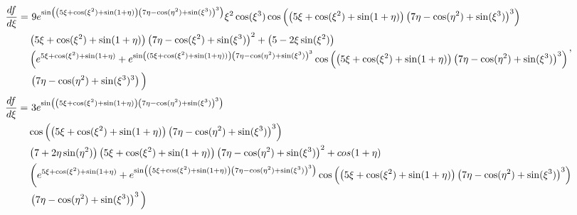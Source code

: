 \begin{landscape}   
    \begin{equation}
        \begin{split}
            \frac{df}{d\xi} =& ~9 e^{\sin\left(\left(5\xi + \cos(\xi^2) + \sin(1 +\eta)\right) \left(7\eta - \cos(\eta^2) + \sin(\xi^3) \right)^3\right)} \xi^2 \cos(\xi^3) \cos\left(\left(5\xi + \cos(\xi^2) + \sin(1+\eta) \right) \left(7\eta - \cos(\eta^2) + \sin(\xi^3) \right)^3\right)\\
            &\left(5\xi + \cos(\xi^2) + \sin(1 + \eta)\right)\left(7\eta - \cos(\xi^2) + \sin(\xi^3)\right)^2 + \left(5 - 2\xi\sin(\xi^2)\right)\\
            &\left(e^{5\xi + \cos(\xi^2) + \sin(1 + \eta)} + e^{\sin\left((5\xi + \cos(\xi^2) + \sin(1 + \eta))\right) \left(7\eta -\cos(\eta^2) +\sin(\xi^3) \right)^3}\cos\left(\left(5\xi +\cos(\xi^2) + \sin(1 + \eta)\right) \left(7\eta - \cos(\eta^2) + \sin(\xi^3) \right)^3 \right)\right.\\
            &\left. \left(7 \eta - \cos(\eta^2) + \sin(\xi^3)^3\right) \vphantom{e^{{5\xi + \cos(\xi^2) + \sin(1 + \eta)}}}\right)
        \end{split},
    \end{equation}
    \begin{equation}
        \begin{split}
            \frac{df}{d\xi} =& ~3e^{\sin\left(\left(5\xi + \cos(\xi^2) + \sin(1 + \eta) \right)\left(7 \eta - \cos(\eta^2) +\sin(\xi^3) \right)^3 \right)} \\
            & \cos\left(\left(5\xi + \cos(\xi^2) + \sin(1 + \eta) \right)\left(7\eta -\cos(\eta^2)+\sin(\xi^3)\right)^3 \right) \\
            & \left(7 + 2\eta \sin(\eta^2)\right)\left(5\xi +\cos(\xi^2) +\sin(1 +\eta)\right)\left(7\eta -\cos(\eta^2) + \sin(\xi^3) \right)^2 + cos(1 + \eta)\\
            & \left(e^{5\xi + \cos(\xi^2) + \sin(1 + \eta)} + e^{\sin\left(\left(5\xi + \cos(\xi^2) +\sin(1+\eta)\right)\left(7\eta -\cos(\eta^2)+\sin(\xi^3)\right)^3\right)}\cos\left(\left(5\xi + \cos(\xi^2) + \sin(1+\eta)\right) \left(7\eta - \cos(\eta^2) + \sin(\xi^3)\right)^3\right)\right.\\
            &\left. \left(7\eta - \cos(\eta^2) + \sin(\xi^3)\right)^3 \vphantom{e^{5\xi + \cos(\xi^2) + \sin(1 + \eta)}}\right)
        \end{split}
    \end{equation}

\end{landscape}